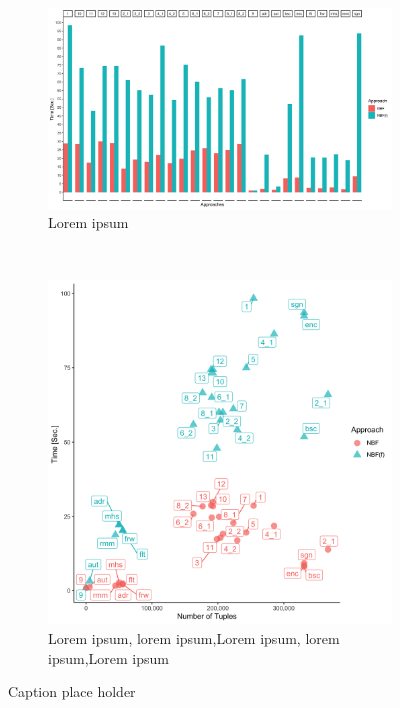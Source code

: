 \begin{figure}[t!]
    \centering
    \begin{subfigure}[t]{0.5\textwidth}
        \centering
        \includegraphics[width=\textwidth]{figs/plots/enron-nbf-comp-f.png}
        \caption{Lorem ipsum}
    \end{subfigure}%
    ~ 
    \begin{subfigure}[t]{0.5\textwidth}
        \centering
        \includegraphics[scale=0.09]{figs/plots/enron-nbf-f-comp-scatter.png}
        \caption{Lorem ipsum, lorem ipsum,Lorem ipsum, lorem ipsum,Lorem ipsum}
    \end{subfigure}
    \caption{Caption place holder}
\end{figure}


